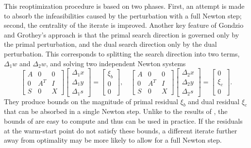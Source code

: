 This reoptimization procedure is based on two phases. First, an attempt 
is made to absorb the infeasibilities caused by the perturbation with a full 
Newton step; second, the centrality of the iterate is improved. Another 
key feature of Gondzio and Grothey's approach \cite{GondzioGrothey03}
is that the primal search 
direction is governed only by the primal perturbation,
and the dual search direction only by the dual perturbation.
This corresponds to splitting the search direction into
two terms, $\Delta_1 w$ and $\Delta_2 w$, and solving
two independent Newton systems
%
\[
\left[ \begin{array}{ccc}
    A & 0 & 0 \\ 0 &A^T & I \\ S & 0 & X
  \end{array} \right]
\left[ \begin{array}{c}
    \Delta_1 x \\ \Delta_1 y \\ \Delta_1 s
  \end{array} \right] = 
\left[ \begin{array}{c}
    \xi_b \\ 0 \\ 0
  \end{array} \right],
\quad
\left[ \begin{array}{ccc}
    A & 0 & 0 \\ 0 &A^T & I \\ S & 0 & X
  \end{array} \right]
\left[ \begin{array}{c}
    \Delta_2 x \\ \Delta_2 y \\ \Delta_2 s
  \end{array} \right] = 
\left[ \begin{array}{c}
    0 \\ \xi_c \\ 0
  \end{array} \right].
\]
%
They produce bounds on the magnitude of primal residual $\xi_b$ 
and dual residual $\xi_c$ that can be absorbed in a single 
Newton step. Unlike to the results of \cite{YildirimWright}, 
the bounds of \cite{GondzioGrothey03} are easy to compute and 
thus can be used in practice.
If the residuals at the warm-start point do not satisfy these bounds,
a different iterate further 
away from optimality may be more likely to allow for a full Newton step.

